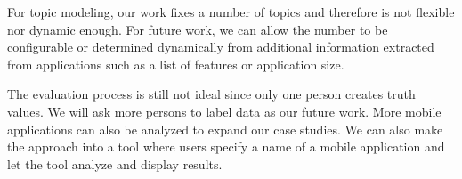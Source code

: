 For topic modeling, our work fixes a number of topics and therefore is not flexible nor dynamic enough. For future work, we can allow the number to be configurable or determined dynamically from additional information extracted from applications such as a list of features or application size.

The evaluation process is still not ideal since only one person creates truth values. We will ask more persons to label data as our future work. More mobile applications can also be analyzed to expand our case studies. We can also make the approach into a tool where users specify a name of a mobile application and let the tool analyze and display results.


%
%


%


